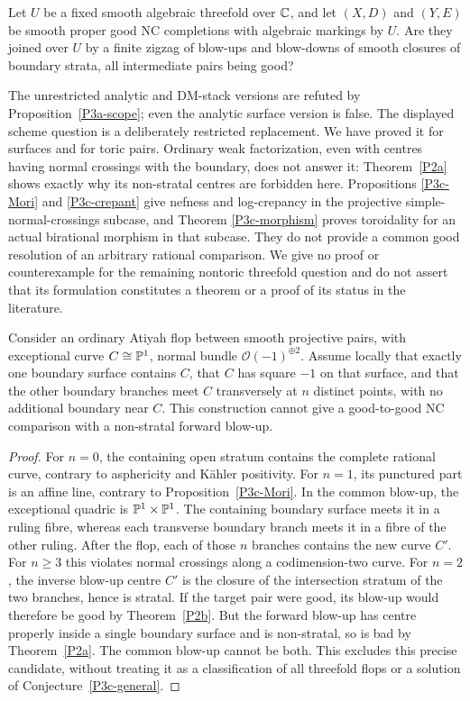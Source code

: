 \begin{conjecture}\label{P3c-general}
Let $U$ be a fixed smooth algebraic threefold over $\mathbb C$, and
let $(X,D)$ and $(Y,E)$ be smooth proper good NC completions
with algebraic markings by $U$. Are they joined over $U$ by
a finite zigzag of blow-ups and blow-downs of smooth closures
of boundary strata, all intermediate pairs being good?
\end{conjecture}

The unrestricted analytic and DM-stack versions are refuted
by Proposition~\ref{P3a-scope}; even the analytic surface
version is false. The displayed scheme question is a
deliberately restricted replacement. We have proved it for
surfaces and for toric pairs. Ordinary weak factorization,
even with centres having normal crossings with the boundary,
does not answer it: Theorem~\ref{P2a} shows exactly why its
non-stratal centres are forbidden here. Propositions
\ref{P3c-Mori} and \ref{P3c-crepant} give nefness and log-crepancy
in the projective simple-normal-crossings subcase, and Theorem
\ref{P3c-morphism} proves toroidality for an actual birational
morphism in that subcase. They do not provide a common good resolution
of an arbitrary rational comparison. We give no proof or
counterexample for the remaining nontoric threefold question
and do not assert that its formulation constitutes a theorem
or a proof of its status in the literature.

\begin{proposition}\label{P3c-flop-test}
Consider an ordinary Atiyah flop between smooth projective pairs,
with exceptional curve
$C\cong\mathbb P^1$, normal bundle $\mathcal O(-1)^{\oplus2}$.
Assume locally that exactly one boundary surface contains
$C$, that $C$ has square $-1$ on that surface, and that the
other boundary branches meet $C$ transversely at $n$ distinct
points, with no additional boundary near $C$. This construction
cannot give a good-to-good NC comparison with a non-stratal
forward blow-up.
\end{proposition}
\begin{proof}
For $n=0$, the containing open stratum contains the complete
rational curve, contrary to asphericity and Kähler positivity.
For $n=1$, its punctured part is an affine line, contrary to
Proposition~\ref{P3c-Mori}. In the common blow-up, the exceptional
quadric is $\mathbb P^1\times\mathbb P^1$. The containing boundary surface
meets it in a ruling fibre, whereas each transverse boundary
branch meets it in a fibre of the other ruling. After the
flop, each of those $n$ branches contains the new curve $C'$.
For $n\ge3$ this violates normal crossings along a codimension-two
curve. For $n=2$, the inverse blow-up centre $C'$ is the closure
of the intersection stratum of the two branches, hence is
stratal. If the target pair were good, its blow-up would
therefore be good by Theorem~\ref{P2b}. But the forward
blow-up has centre properly inside a single boundary surface
and is non-stratal, so is bad by Theorem~\ref{P2a}. The common
blow-up cannot be both. This excludes this precise candidate,
without treating it as a classification of all threefold
flops or a solution of Conjecture~\ref{P3c-general}.
\end{proof}
